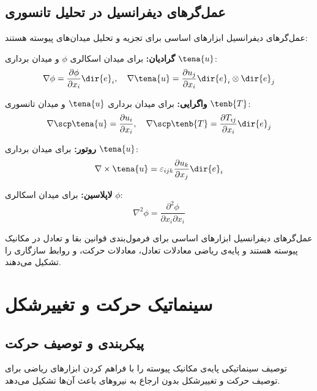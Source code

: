 \subsection{عمل‌گرهای دیفرانسیل در تحلیل تانسوری}

عمل‌گرهای دیفرانسیل ابزارهای اساسی برای تجزیه و تحلیل میدان‌های پیوسته هستند:

\textbf{گرادیان:} برای میدان اسکالری $\phi$ و میدان برداری $\tena{u}$:
\begin{equation}
	\nabla \phi = \frac{\partial \phi}{\partial x_i} \dir{e}_i, \quad \nabla \tena{u} = \frac{\partial u_j}{\partial x_i} \dir{e}_i \otimes \dir{e}_j
\end{equation}

\textbf{واگرایی:} برای میدان برداری $\tena{u}$ و میدان تانسوری $\tenb{T}$:
\begin{equation}
	\nabla \scp \tena{u} = \frac{\partial u_i}{\partial x_i}, \quad \nabla \scp \tenb{T} = \frac{\partial T_{ij}}{\partial x_i} \dir{e}_j
\end{equation}

\textbf{روتور:} برای میدان برداری $\tena{u}$:
\begin{equation}
	\nabla \times \tena{u} = \varepsilon_{ijk} \frac{\partial u_k}{\partial x_j} \dir{e}_i
\end{equation}

\textbf{لاپلاسین:} برای میدان اسکالری $\phi$:
\begin{equation}
	\nabla^2 \phi = \frac{\partial^2 \phi}{\partial x_i \partial x_i}
\end{equation}

\begin{keypoint}
عمل‌گرهای دیفرانسیل ابزارهای اساسی برای فرمول‌بندی قوانین بقا و تعادل در مکانیک پیوسته هستند و پایه‌ی ریاضی معادلات تعادل، معادلات حرکت، و روابط سازگاری را تشکیل می‌دهند.
\end{keypoint}

\section{سینماتیک حرکت و تغییرشکل}

\subsection{پیکربندی و توصیف حرکت}

توصیف سینماتیکی پایه‌ی مکانیک پیوسته را با فراهم کردن ابزارهای ریاضی برای توصیف حرکت و تغییرشکل بدون ارجاع به نیروهای باعث آن‌ها تشکیل می‌دهد.

